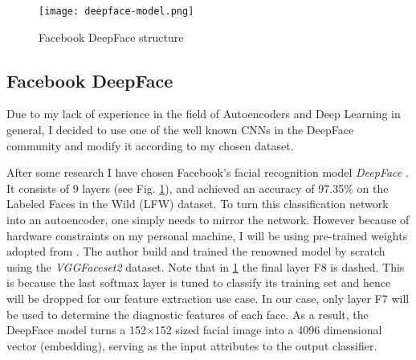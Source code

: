 \begin{figure}[ht]
  \centering
  \texttt{[image: deepface-model.png]}
  \caption{Facebook DeepFace structure}
  \label{dfstructure}
\end{figure}

\subsection{Facebook DeepFace} \label{sec:deepFace} Due to my lack of experience
in the field of Autoencoders and Deep Learning in general, I decided to use one
of the well known CNNs in the DeepFace community and modify it according to my
chosen dataset.

After some research I have chosen Facebook's facial recognition model
\textit{DeepFace} \cite{taigman2014deepface}. It consists of 9 layers (see Fig.
\ref{dfstructure}), and achieved an accuracy of 97.35\% on the Labeled Faces in
the Wild (LFW) dataset. To turn this classification network into an autoencoder,
one simply needs to mirror the network. However because of hardware constraints
on my personal machine, I will be using pre-trained weights adopted from
\cite{serengil2017tensorflow101}. The author build and trained the renowned
model by scratch using the \textit{VGGFaceset2} dataset. Note that in
\ref{dfstructure} the final layer F8 is dashed. This is because the last softmax
layer is tuned to classify its training set and hence will be dropped for our
feature extraction use case. In our case, only layer F7 will be used to
determine the diagnostic features of each face. As a result, the DeepFace model
turns a 152$\times$152 sized facial image into a 4096 dimensional vector
(embedding), serving as the input attributes to the output classifier. 
